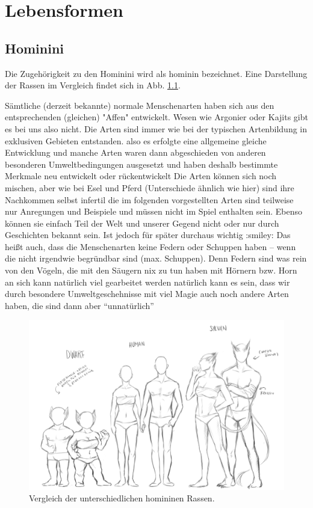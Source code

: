 \chapter{Lebensformen}
\section{Hominini}
Die Zugehörigkeit zu den Hominini wird als hominin bezeichnet. Eine Darstellung der Rassen im Vergleich findet sich in Abb. \ref{fig:allerassen}.
\begin{outline}
	\1 Sämtliche (derzeit bekannte) normale Menschenarten haben sich aus den entsprechenden (gleichen) "Affen" entwickelt. Wesen wie Argonier oder Kajits gibt es bei uns also nicht.
	\1 Die Arten sind immer wie bei der typischen Artenbildung in exklusiven Gebieten entstanden. also es erfolgte eine allgemeine gleiche Entwicklung und manche Arten waren dann abgeschieden von anderen besonderen Umweltbedingungen ausgesetzt und haben deshalb bestimmte Merkmale neu entwickelt oder rückentwickelt
	\1 Die Arten können sich noch mischen, aber wie bei Esel und Pferd (Unterschiede ähnlich wie hier) sind ihre Nachkommen selbst infertil
	\1 die im folgenden vorgestellten Arten sind teilweise nur Anregungen und Beispiele und müssen nicht im Spiel enthalten sein. Ebenso können sie einfach Teil der Welt und unserer Gegend nicht oder nur durch Geschichten bekannt sein. Ist jedoch für später durchaus wichtig :smiley:
	\1 Das heißt auch, dass die Menschenarten keine Federn oder Schuppen haben -- wenn die nicht irgendwie begründbar sind (max. Schuppen). Denn Federn sind was rein von den Vögeln, die mit den Säugern nix zu tun haben
	mit Hörnern bzw. Horn an sich kann natürlich viel gearbeitet werden
	\1 natürlich kann es sein, dass wir durch besondere Umweltgeschehnisse mit viel Magie auch noch andere Arten haben, die sind dann aber "`unnatürlich"'
\end{outline}

\begin{figure}
	\centering
	\includegraphics[width=1.0\linewidth]{Abbildungen/Weltenbau/Lebensformen/allerassen}
	\caption{Vergleich der unterschiedlichen homininen Rassen.}
	\label{fig:allerassen}
\end{figure}


